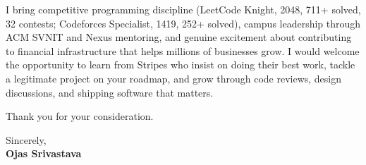 \documentclass[a4paper,11pt]{article}
\begin{document}
I bring competitive programming discipline (LeetCode Knight, 2048, 711+ solved, 32 contests; Codeforces Specialist, 1419, 252+ solved), campus leadership through ACM SVNIT and Nexus mentoring, and genuine excitement about contributing to financial infrastructure that helps millions of businesses grow. I would welcome the opportunity to learn from Stripes who insist on doing their best work, tackle a legitimate project on your roadmap, and grow through code reviews, design discussions, and shipping software that matters.

Thank you for your consideration.

Sincerely, \\
\vspace{8mm}
\textbf{Ojas Srivastava}
\end{document}
